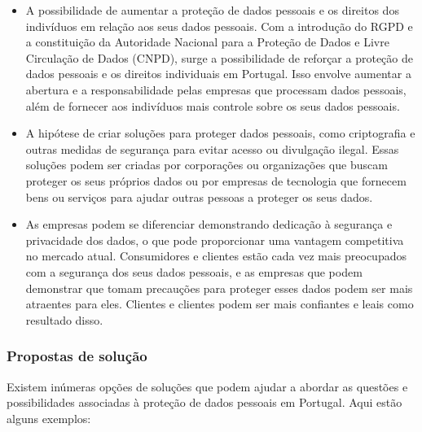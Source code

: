\begin{itemize}
  \item A possibilidade de aumentar a proteção de dados pessoais e os direitos dos indivíduos em relação aos seus dados pessoais. Com a introdução do RGPD e a constituição da Autoridade Nacional para a Proteção de Dados e Livre Circulação de Dados (CNPD), surge a possibilidade de reforçar a proteção de dados pessoais e os direitos individuais em Portugal. Isso envolve aumentar a abertura e a responsabilidade pelas empresas que processam dados pessoais, além de fornecer aos indivíduos mais controle sobre os seus dados pessoais.
  \item A hipótese de criar soluções para proteger dados pessoais, como criptografia e outras medidas de segurança para evitar acesso ou divulgação ilegal. Essas soluções podem ser criadas por corporações ou organizações que buscam proteger os seus próprios dados ou por empresas de tecnologia que fornecem bens ou serviços para ajudar outras pessoas a proteger os seus dados.
  \item As empresas podem se diferenciar demonstrando dedicação à segurança e privacidade dos dados, o que pode proporcionar uma vantagem competitiva no mercado atual. Consumidores e clientes estão cada vez mais preocupados com a segurança dos seus dados pessoais, e as empresas que podem demonstrar que tomam precauções para proteger esses dados podem ser mais atraentes para eles. Clientes e clientes podem ser mais confiantes e leais como resultado disso.
\end{itemize}

\subsubsection{Propostas de solução}

Existem inúmeras opções de soluções que podem ajudar a abordar as questões e possibilidades associadas à proteção de dados pessoais em Portugal. Aqui estão alguns exemplos:

